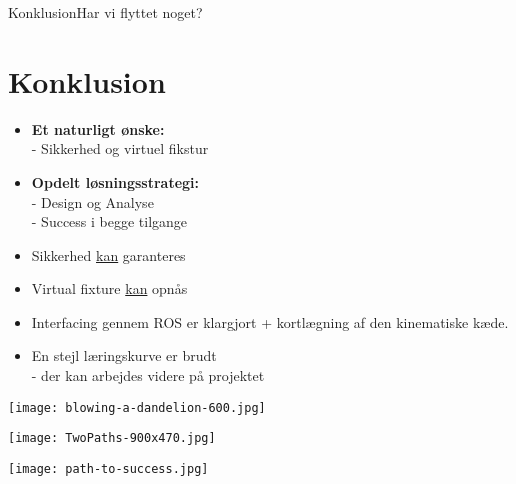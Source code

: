 \begin{frame}{Konklusion}{Har vi flyttet noget?}
\section{Konklusion}
\begin{minipage}{0.6\textwidth}
\begin{block}{}
	\begin{itemize}
		\item \textbf{Et naturligt ønske:}\\ - Sikkerhed og virtuel fikstur
		\item \textbf{Opdelt løsningsstrategi:}\\ - Design og Analyse \\
		- Success i begge tilgange 
		\vspace{0.5cm}
		\item Sikkerhed \underline{kan} garanteres
		\item Virtual fixture \underline{kan} opnås
		\item \normalsize Interfacing gennem ROS er klargjort + kortlægning af den kinematiske kæde.
		\item En stejl læringskurve er brudt \\ 
		\scriptsize - der kan arbejdes videre på projektet
	\end{itemize}
\end{block}
\end{minipage}
\begin{minipage}{0.35\textwidth}
\texttt{[image: blowing-a-dandelion-600.jpg]}
\vspace*{0.2cm}

\texttt{[image: TwoPaths-900x470.jpg]}
\vspace*{0.2cm}

\texttt{[image: path-to-success.jpg]}
\end{minipage}
\end{frame}

